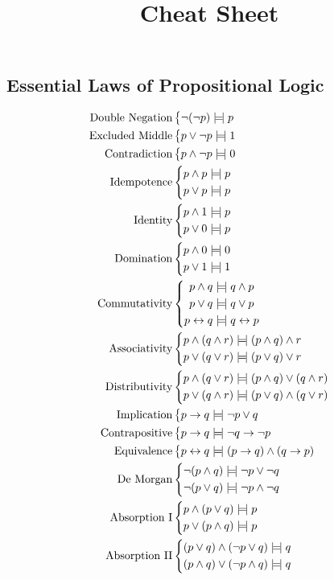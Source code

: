 \documentclass[class=cs245,nogeometry]{agony}
\title{Cheat Sheet}
\newcommand{\law}[2]{\text{#1}&\left\{\begin{aligned}#2\end{aligned}\right.\\}
\begin{document}
\begin{multicols}{2}
  \section*{Essential Laws of Propositional Logic}
  \begin{align*}
    \law{Double Negation}{\lnot(\lnot p) \tequiv p}
    \law{Excluded Middle}{p \lor \lnot p \tequiv 1}
    \law{Contradiction}{p \land \lnot p \tequiv 0}
    \law{Idempotence}{
    p \land p                          & \tequiv p                            \\
    p \lor p                           & \tequiv p                            \\
    }
    \law{Identity}{
    p \land 1                          & \tequiv p                            \\
    p \lor 0                           & \tequiv p                            \\
    }
    \law{Domination}{
    p \land 0                          & \tequiv 0                            \\
    p \lor 1                           & \tequiv 1                            \\
    }
    \law{Commutativity}{
    p \land q                          & \tequiv q \land p                    \\
    p \lor q                           & \tequiv q \lor p                     \\
    p \harr q                          & \tequiv q \harr p                    \\
    }
    \law{Associativity}{
    p \land (q \land r)                & \tequiv (p \land q) \land r          \\
    p \lor (q \lor r)                  & \tequiv (p \lor q) \lor r            \\
    }
    \law{Distributivity}{
    p \land (q \lor r)                 & \tequiv (p \land q) \lor (q \land r) \\
    p \lor (q \land r)                 & \tequiv (p \lor q) \land (q \lor r)  \\
    }
    \law{Implication}{p \to q \tequiv \lnot p \lor q}
    \law{Contrapositive}{p \to q \tequiv \lnot q \to \lnot p}
    \law{Equivalence}{p \harr q \tequiv (p \to q) \land (q \to p)}
    \law{De Morgan}{
    \lnot(p \land q)                   & \tequiv \lnot p \lor \lnot q         \\
    \lnot(p \lor q)                    & \tequiv \lnot p \land \lnot q        \\
    }
    \law{Absorption I}{
    p \land (p \lor q)                 & \tequiv p                            \\
    p \lor (p \land q)                 & \tequiv p                            \\
    }
    \law{Absorption II}{
    (p \lor q) \land (\lnot p \lor q)  & \tequiv q                            \\
    (p \land q) \lor (\lnot p \land q) & \tequiv q                            \\
    }
  \end{align*}

\end{multicols}
\end{document}

